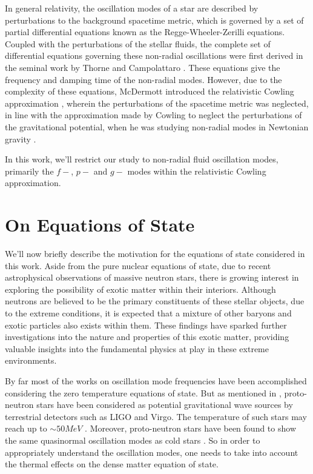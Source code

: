 \documentclass[a4paper,12pt,onehalfspacing]{report}
\begin{document}
In general relativity, the oscillation modes of a star are described by perturbations to the background spacetime metric, which is governed by a set of partial differential equations known as the Regge-Wheeler-Zerilli equations. Coupled with the perturbations of the stellar fluids, the complete set of differential equations governing these non-radial oscillations were first derived in the seminal work by Thorne and Campolattaro \cite{Thorne_Campo}. These equations give the frequency and damping time of the non-radial modes. However, due to the complexity of these equations, McDermott introduced the relativistic Cowling approximation \cite{mcdermottNonradialGmodeOscillations1983}, wherein the perturbations of the spacetime metric was neglected, in line with the approximation made by Cowling to neglect the perturbations of the gravitational potential, when he was studying non-radial modes in Newtonian gravity \cite{cowlingNonradialOscillationsPolytropic1941}.

In this work, we'll restrict our study to non-radial fluid oscillation modes, primarily the $f-$, $p-$ and $g-$ modes within the relativistic Cowling approximation. 

\section{On Equations of State}\label{sec: eos intro}

We'll now briefly describe the motivation for the equations of state considered in this work. Aside from the pure nuclear equations of state, due to recent astrophysical observations of massive neutron stars, there is growing interest in exploring the possibility of exotic matter within their interiors. Although neutrons are believed to be the primary constituents of these stellar objects, due to the extreme conditions, it is expected that a mixture of other baryons and exotic particles also exists within them. These findings have sparked further investigations into the nature and properties of this exotic matter, providing valuable insights into the fundamental physics at play in these extreme environments. 

By far most of the works on oscillation mode frequencies have been accomplished considering the zero temperature equations of state. But as mentioned in \cite{ferrariGravitationalWavesNewly2003}, proto-neutron stars have been considered as potential gravitational wave sources by terrestrial detectors such as LIGO and Virgo. The temperature of such stars may reach up to $\sim 50 MeV$ \cite{dexheimerProtoNeutronNeutron2008}. Moreover, proto-neutron stars have been found to show the same quasinormal oscillation modes as cold stars \cite{ferrariGravitationalWavesNewly2003,burgioOscillationsHotYoung2011,PhysRevD.94.044043,PhysRevD.100.083008}. So in order to appropriately understand the oscillation modes, one needs to take into account the thermal effects on the dense matter equation of state. 
\end{document}

